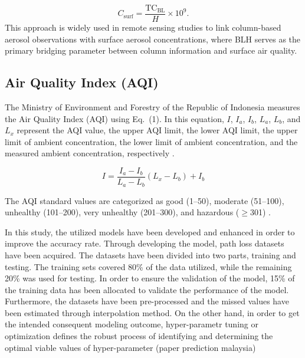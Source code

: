 \documentclass[pdflatex,sn-mathphys-num]{sn-jnl}%
\theoremstyle{thmstyleone}%
\theoremstyle{thmstyletwo}%
\theoremstyle{thmstylethree}%
\begin{document}
\begin{equation}
C_{\mathrm{surf}} = \frac{\mathrm{TC}_{\mathrm{BL}}}{H} \times 10^{9}.
\end{equation}
This approach is widely used in remote sensing studies to link column-based aerosol observations with surface aerosol concentrations, where BLH serves as the primary bridging parameter between column information and surface air quality.

\subsection{Air Quality Index (AQI)}

The Ministry of Environment and Forestry of the Republic of Indonesia measures the Air Quality Index (AQI) using Eq.~(1). In this equation, $I$, $I_a$, $I_b$, $L_a$, $L_b$, and $L_x$ represent the AQI value, the upper AQI limit, the lower AQI limit, the upper limit of ambient concentration, the lower limit of ambient concentration, and the measured ambient concentration, respectively \cite{KLHK2020}.

\begin{equation}
I = \frac{I_a - I_b}{L_a - L_b} \left( L_x - L_b \right) + I_b
\tag{1}
\end{equation}

The AQI standard values are categorized as good (1--50), moderate (51--100), unhealthy (101--200), very unhealthy (201--300), and hazardous ($\geq$301) \cite{KLHK}.

In this study, the utilized models have been developed and enhanced in order to improve the accuracy rate. Through developing the model, path loss datasets have been acquired. The datasets have been divided into two parts, training and testing. The training sets covered 80\% of the data utilized, while the remaining 20\% was used for testing. In order to ensure the validation of the model, 15\% of the training data has been allocated to validate the performance of the model. Furthermore, the datasets have been pre-processed and the missed values have been estimated through interpolation method. On the other hand, in order to get the intended consequent modeling outcome, hyper-parametr tuning or optimization defines the robust process of identifying and determining the optimal viable values of hyper-parameter (paper prediction malaysia)
\end{document}
